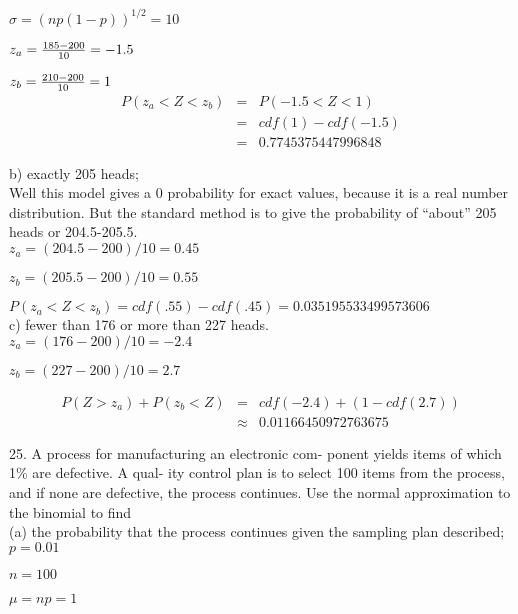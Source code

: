$\sigma = (np(1-p))^{1/2} = 10 $

$z_a = \frac{185 - 200}{10} = -1.5$

$z_b = \frac{210 - 200}{10} = 1$ \\


\begin{eqnarray*}
P(z_a < Z < z_b) & = & P(-1.5 < Z < 1) \\ 
  & =&  cdf(1) - cdf(-1.5)  \\
& = & 0.7745375447996848 
\end{eqnarray*}


b) exactly 205 heads; \\

Well this model gives a 0 probability for exact values, because it is a real number distribution. But the standard method is to give the probability of ``about'' 205 heads or 204.5-205.5. \\

$z_a = (204.5 - 200)/10 = 0.45$

$z_b = (205.5 - 200)/10 = 0.55$

$P(z_a < Z < z_b) = cdf(.55) - cdf(.45) = 0.035195533499573606$ \\

c) fewer than 176 or more than 227 heads. \\

$z_a = (176 - 200)/10 = -2.4$

$z_b = (227 - 200)/10 = 2.7$

\begin{eqnarray*}
P(Z > z_a) + P(z_b < Z) & = & cdf(-2.4) + (1 - cdf(2.7)) \\
                        & \approx & 0.01166450972763675 
\end{eqnarray*}

25. A process for manufacturing an electronic com-
ponent yields items of which 1\% are defective. A qual-
ity control plan is to select 100 items from the process,
and if none are defective, the process continues. Use
the normal approximation to the binomial to find \\

(a) the probability that the process continues given the
sampling plan described; \\

$p = 0.01$

$n = 100$

$\mu = np = 1$

